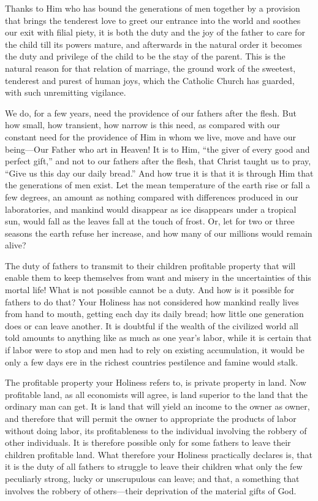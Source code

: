 \documentclass{book}
\begin{document}
Thanks to Him who has bound the generations of men together by a provision that brings the tenderest love to greet our entrance into the world and soothes our exit with filial piety, it is both the duty and the joy of the father to care for the child till its powers mature, and afterwards in the natural order it becomes the duty and privilege of the child to be the stay of the parent. This is the natural reason for that relation of marriage, the ground work of the sweetest, tenderest and purest of human joys, which the Catholic Church has guarded, with such unremitting vigilance.

We do, for a few years, need the providence of our fathers after the flesh. But how small, how transient, how narrow is this need, as compared with our constant need for the providence of Him in whom we live, move and have our being—Our Father who art in Heaven! It is to Him, “the giver of every good and perfect gift,” and not to our fathers after the flesh, that Christ taught us to pray, “Give us this day our daily bread.” And how true it is that it is through Him that the generations of men exist. Let the mean temperature of the earth rise or fall a few degrees, an amount as nothing compared with differences produced in our laboratories, and mankind would disappear as ice disappears under a tropical sun, would fall as the leaves fall at the touch of frost. Or, let for two or three seasons the earth refuse her increase, and how many of our millions would remain alive?

The duty of fathers to transmit to their children profitable property that will enable them to keep themselves from want and misery in the uncertainties of this mortal life! What is not possible cannot be a duty. And how is it possible for fathers to do that? Your Holiness has not considered how mankind really lives from hand to mouth, getting each day its daily bread; how little one generation does or can leave another. It is doubtful if the wealth of the civilized world all told amounts to anything like as much as one year’s labor, while it is certain that if labor were to stop and men had to rely on existing accumulation, it would be only a few days ere in the richest countries pestilence and famine would stalk.

The profitable property your Holiness refers to, is private property in land. Now profitable land, as all economists will agree, is land superior to the land that the ordinary man can get. It is land that will yield an income to the owner as owner, and therefore that will permit the owner to appropriate the products of labor without doing labor, its profitableness to the individual involving the robbery of other individuals. It is therefore possible only for some fathers to leave their children profitable land. What therefore your Holiness practically declares is, that it is the duty of all fathers to struggle to leave their children what only the few peculiarly strong, lucky or unscrupulous can leave; and that, a something that involves the robbery of others—their deprivation of the material gifts of God.
\end{document}

